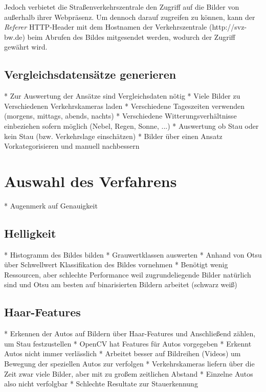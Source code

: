Jedoch verbietet die Straßenverkehrszentrale den Zugriff auf die Bilder von außerhalb ihrer Webpräsenz.
Um dennoch darauf zugreifen zu können, kann der {\em Referer} HTTP-Header mit dem Hostnamen der Verkehrszentrale (http://svz-bw.de) beim Abrufen des Bildes mitgesendet werden, wodurch der Zugriff gewährt wird. 

\subsection{Vergleichsdatensätze generieren}
* Zur Auswertung der Ansätze sind Vergleichsdaten nötig\newline
* Viele Bilder zu Verschiedenen Verkehrskameras laden\newline
* Verschiedene Tageszeiten verwenden (morgens, mittags, abends, nachts)\newline
* Verschiedene Witterungsverhältnisse einbeziehen sofern möglich (Nebel, Regen, Sonne, ...)\newline
* Auswertung ob Stau oder kein Stau (bzw. Verkehrslage einschätzen)\newline
* Bilder über einen Ansatz Vorkategorisieren und manuell nachbessern\newline

\section{Auswahl des Verfahrens}
* Augenmerk auf Genauigkeit

\subsection{Helligkeit}
* Histogramm des Bildes bilden\newline
* Grauwertklassen auswerten\newline
* Anhand von Otsu über Schwellwert Klassifikation des Bildes vornehmen\newline
* Benötigt wenig Ressourcen, aber schlechte Performance weil zugrundeliegende Bilder \newline
	natürlich sind und Otsu am besten auf binarisierten Bildern arbeitet (schwarz weiß)
	
\subsection{Haar-Features}
* Erkennen der Autos auf Bildern über Haar-Features und Anschließend zählen, um Stau festzustellen\newline
* OpenCV hat Features für Autos vorgegeben\newline
* Erkennt Autos nicht immer verlässlich\newline
* Arbeitet besser auf Bildreihen (Videos) um Bewegung der speziellen Autos zur verfolgen\newline
* Verkehrskameras liefern über die Zeit zwar viele Bilder, aber mit zu großem zeitlichen Abstand\newline
* Einzelne Autos also nicht verfolgbar\newline
* Schlechte Resultate zur Stauerkennung\newline

